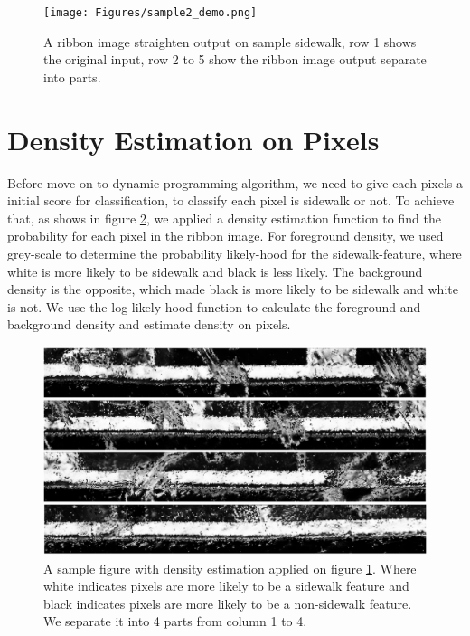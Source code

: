 \begin{figure}
    \centering
    \texttt{[image: Figures/sample2\_demo.png]}
    \caption[Sample Sidewalk 2]{A ribbon image straighten output on sample sidewalk, row 1 shows the original input, row 2 to 5 show the ribbon image output separate into parts.}
    \label{fig:Sample_Sidewalk_2}
\end{figure}


\section{Density Estimation on Pixels}

Before move on to dynamic programming algorithm, we need to give each pixels a initial score for classification, to classify each pixel is sidewalk or not. 
To achieve that, as shows in figure \ref{fig:GMM_Sample_2}, we applied a density estimation function to find the probability for each pixel in the ribbon image. 
For foreground density, we used grey-scale to determine the probability likely-hood for the sidewalk-feature, where white is more likely to be sidewalk and black is less likely. 
The background density is the opposite, which made black is more likely to be sidewalk and white is not. 
We use the log likely-hood function to calculate the foreground and background density and estimate density on pixels.

\begin{figure}[H]
    \centering
    \includegraphics[width=\textwidth]{Figures/GMM_SAMPLE2.png}
    \caption[Density Estimation on Sample Sidewalk]{A sample figure with density estimation applied on figure \ref{fig:Sample_Sidewalk_2}. Where white indicates pixels are more likely to be a sidewalk feature and black indicates pixels are more likely to be a non-sidewalk feature. We separate it into 4 parts from column 1 to 4.}
    \label{fig:GMM_Sample_2}
\end{figure}

